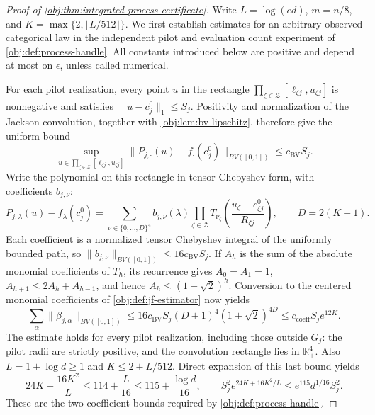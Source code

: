 \begin{proof}[Proof of \cref{obj:thm:integrated-process-certificate}]
Write \(L=\log(ed)\), \(m=n/8\), and \(K=\max\{2,\lfloor L/512\rfloor\}\). We first establish estimates for an arbitrary observed categorical law in the independent pilot and evaluation count experiment of \cref{obj:def:process-handle}. All constants introduced below are positive and depend at most on \(\epsilon\), unless called numerical.

For each pilot realization, every point \(u\) in the rectangle \(\prod_{\zeta\in\mathcal Z}[\ell_{\zeta j},u_{\zeta j}]\) is nonnegative and satisfies \(\|u-c_j^0\|_1\leq S_j\). Positivity and normalization of the Jackson convolution, together with \cref{obj:lem:bv-lipschitz}, therefore give the uniform bound
\[
\sup_{u\in\prod_{\zeta\in\mathcal Z}[\ell_{\zeta j},u_{\zeta j}]}
\|P_{j,\cdot}(u)-f_\cdot(c_j^0)\|_{BV([0,1])}
\leq c_{\mathrm{BV}}S_j.
\]
Write the polynomial on this rectangle in tensor Chebyshev form, with coefficients \(b_{j,\nu}\):
\[
P_{j,\lambda}(u)-f_\lambda(c_j^0)
 =\sum_{\nu\in\{0,\ldots,D\}^4}b_{j,\nu}(\lambda)
   \prod_{\zeta\in\mathcal Z}
   T_{\nu_\zeta}\!\left(\frac{u_\zeta-c^0_{\zeta j}}{R_{\zeta j}}\right),
\qquad D=2(K-1).
\]
Each coefficient is a normalized tensor Chebyshev integral of the uniformly bounded path, so \(\|b_{j,\nu}\|_{BV([0,1])}\leq16c_{\mathrm{BV}}S_j\). If \(A_h\) is the sum of the absolute monomial coefficients of \(T_h\), its recurrence gives \(A_0=A_1=1\), \(A_{h+1}\leq2A_h+A_{h-1}\), and hence \(A_h\leq(1+\sqrt2)^h\). Conversion to the centered monomial coefficients of \cref{obj:def:jf-estimator} now yields
\[
\sum_\alpha\|\beta_{j,\alpha}\|_{BV([0,1])}
 \leq16c_{\mathrm{BV}}S_j(D+1)^4(1+\sqrt2)^{4D}
 \leq c_{\mathrm{coeff}}S_j e^{12K}.
\]
The estimate holds for every pilot realization, including those outside \(G_j\): the pilot radii are strictly positive, and the convolution rectangle lies in \(\mathbb R_+^4\). Also \(L=1+\log d\geq1\) and \(K\leq2+L/512\). Direct expansion of this last bound yields
\[
24K+\frac{16K^2}{L}\leq114+\frac L{16}
 \leq115+\frac{\log d}{16},
\qquad
S_j^2e^{24K+16K^2/L}\leq e^{115}d^{1/16}S_j^2.
\]
These are the two coefficient bounds required by \cref{obj:def:process-handle}. %


\end{proof}
